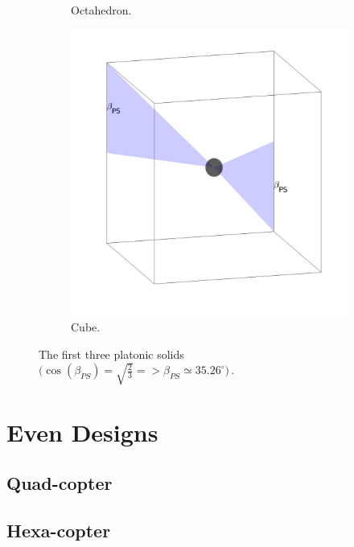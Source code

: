 \begin{figure}[!h]
\begin{subfigure}[b]{0.27\textwidth}
    \caption{Octahedron.} \label{fig:octahedron}
  \end{subfigure}
  \hspace*{\fill} %
  \begin{subfigure}[b]{0.26\textwidth}
    \includegraphics[width=\linewidth]{images/cube.jpg}
    \caption{Cube.} \label{fig:cube}
  \end{subfigure}
  \caption{The first three platonic solids $\big(\cos(\beta_{PS}) = \sqrt{\frac{2}{3}}
  =>  \beta_{PS} \simeq 35.26^{\circ}\big)\, .$}
  \label{fig:platonic_solid}
\end{figure}



\section{Even Designs}
\label{sec:even_designs}

\subsection{Quad-copter}
\label{sec:quad_copter}

\subsection{Hexa-copter}
\label{sec:hexa_copter}

